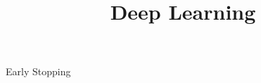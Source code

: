 




\newcommand{\titlefigure}{figure_man/earlystop.png}
\newcommand{\learninggoals}{
  \item Know how early stopping works 
  \item Understand how early stopping acts as a regularizer
  \item Know early stopping imitates $L2$ regularization in some cases
}

\title{Deep Learning}
\date{}




\begin{vbframe}{Early Stopping}
  

\end{vbframe}
